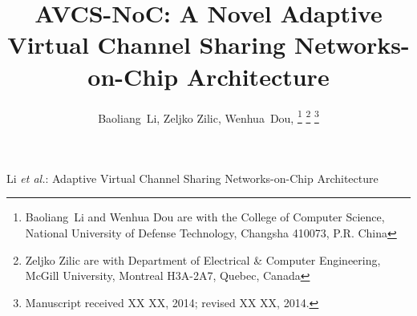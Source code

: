 \documentclass[10pt,conference]{IEEEtran}
\begin{document}
\title{AVCS-NoC: A Novel Adaptive Virtual Channel Sharing Networks-on-Chip Architecture}
\author{Baoliang~Li, %
        Zeljko Zilic, %
        Wenhua~Dou, %
\thanks{Baoliang~Li and Wenhua Dou are with the College of Computer Science, National University of Defense Technology, Changsha 410073, P.R. China}%
\thanks{Zeljko Zilic are with Department of Electrical \& Computer Engineering, McGill University, Montreal H3A-2A7, Quebec, Canada}%
\thanks{Manuscript received XX XX, 2014; revised XX XX, 2014.}}

%
{Li \MakeLowercase{\textit{et al.}}: Adaptive Virtual Channel Sharing Networks-on-Chip Architecture}

\maketitle
\end{document}
